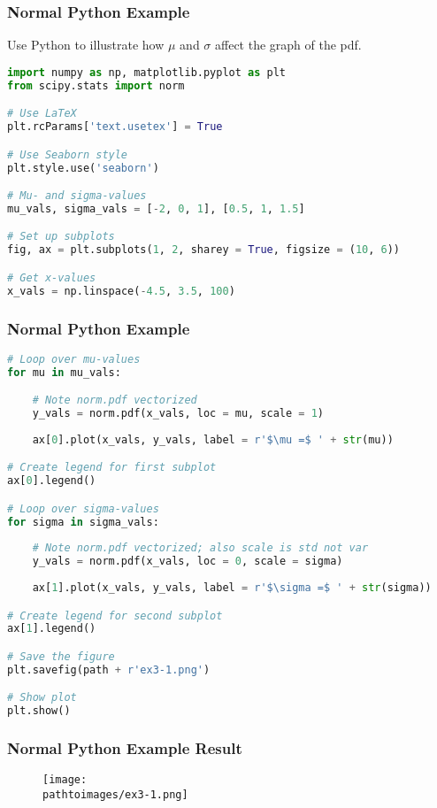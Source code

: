 \documentclass{beamer}
\newcommand{\pathtoimages}{/Users/charlesrambo/Desktop/Bootcamp24/Images}
\begin{document}
\begin{frame}[fragile]
\frametitle{Normal Python Example}
\small
\begin{Example}
Use Python to illustrate how $\mu$ and $\sigma$ affect the graph of the pdf.
\end{Example}

\begin{lstlisting}[language=Python]
import numpy as np, matplotlib.pyplot as plt
from scipy.stats import norm

# Use LaTeX
plt.rcParams['text.usetex'] = True

# Use Seaborn style
plt.style.use('seaborn')

# Mu- and sigma-values
mu_vals, sigma_vals = [-2, 0, 1], [0.5, 1, 1.5]

# Set up subplots
fig, ax = plt.subplots(1, 2, sharey = True, figsize = (10, 6))

# Get x-values
x_vals = np.linspace(-4.5, 3.5, 100)
\end{lstlisting}

\end{frame}

\begin{frame}[fragile]
\frametitle{Normal Python Example}
\begin{lstlisting}[language=Python]
# Loop over mu-values
for mu in mu_vals:

    # Note norm.pdf vectorized
    y_vals = norm.pdf(x_vals, loc = mu, scale = 1)
    
    ax[0].plot(x_vals, y_vals, label = r'$\mu =$ ' + str(mu))

# Create legend for first subplot
ax[0].legend()

# Loop over sigma-values
for sigma in sigma_vals:
    
    # Note norm.pdf vectorized; also scale is std not var
    y_vals = norm.pdf(x_vals, loc = 0, scale = sigma)
    
    ax[1].plot(x_vals, y_vals, label = r'$\sigma =$ ' + str(sigma))

# Create legend for second subplot
ax[1].legend()

# Save the figure
plt.savefig(path + r'ex3-1.png')

# Show plot
plt.show()
\end{lstlisting}

\end{frame}

\begin{frame}[fragile]
\frametitle{Normal Python Example Result}

\begin{figure}
\centering
\texttt{[image: \\pathtoimages/ex3-1.png]}
\end{figure}

\end{frame}
\end{document}
